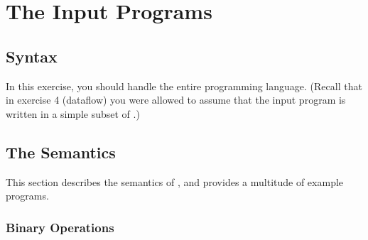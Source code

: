 \documentclass{article}
\begin{document}
\section{The Input Programs}

\subsection{Syntax}
In this exercise, you should handle the entire \plname{} programming language. (Recall that in exercise 4 (dataflow) you were allowed to assume that the input program is written in a simple subset of \plname.)


\subsection{The \plname Semantics}
This section describes the semantics of \plname,
and provides a multitude of example programs.
  
\subsubsection{Binary Operations}
\end{document}
